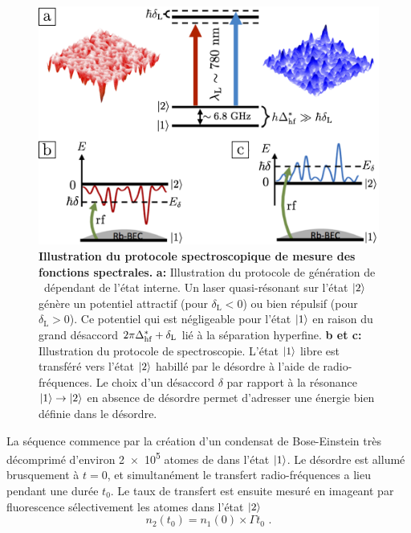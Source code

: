\begin{figure}
\centering
\includegraphics[scale=1.2]{Fig/TauS_NJP/illustration_mesure_fonction_spectrale.pdf}
\caption{\textbf{Illustration du protocole spectroscopique de mesure des fonctions spectrales.} \textbf{a:} Illustration du protocole de génération de \speckle\ dépendant de l'état interne. Un laser quasi-résonant sur l'état $\protect\left| 2 \right\rangle$ génère un potentiel attractif (pour $\delta_{\mathrm{L}}<0$) ou bien répulsif (pour $\delta_{\mathrm{L}}>0$). Ce potentiel qui est négligeable pour l'état $\protect\left| 1 \right\rangle$ en raison du grand désaccord $2\pi\Delta_{\mathrm{hf}}^*+\delta_{\mathrm{L}}$ lié à la séparation hyperfine. \textbf{b et c:} Illustration du protocole de spectroscopie. L'état $\protect\left| 1 \right\rangle$ libre est transféré vers l'état $\protect\left| 2 \right\rangle$ habillé par le désordre à l'aide de radio-fréquences. Le choix d'un désaccord $\delta$ par rapport à la résonance $\protect\left| 1 \right\rangle\rightarrow \protect\left| 2 \right\rangle$ en absence de désordre permet d'adresser une énergie bien définie dans le désordre. }
\label{fig:illustration_fonction_spectrale}
\end{figure}

La séquence commence par la création d'un condensat de Bose-Einstein  très décomprimé d'environ \SI{2e5}{} atomes de  dans l'état $\left| 1 \right\rangle$. Le désordre est allumé brusquement à $t=0$, et simultanément  le transfert radio-fréquences a lieu pendant une durée $t_0$. Le taux de transfert est ensuite mesuré en imageant par fluorescence sélectivement les atomes dans l'état $\left| 2 \right\rangle$
\begin{equation}
n_2(t_0)=n_1(0) \times \Gamma t_0 \text{ .}
\end{equation}



